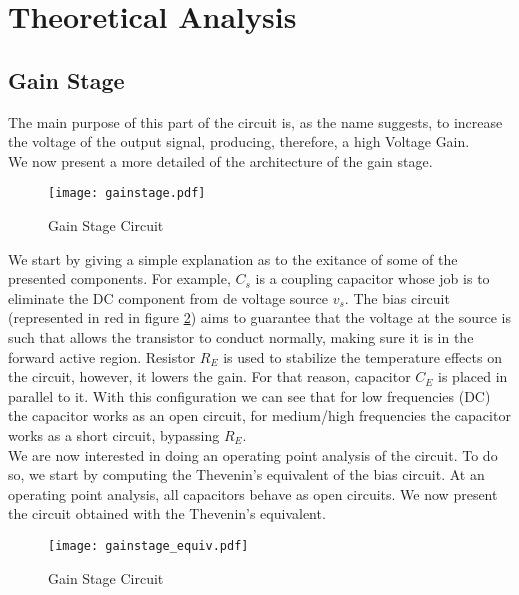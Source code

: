 \section{Theoretical Analysis}
\label{sec:theoretical}



\subsection{Gain Stage}
\par The main purpose of this part of the circuit is, as the name suggests, to increase the voltage of the output signal, producing, therefore, a high Voltage Gain.\\
We now present a more detailed of the architecture of the gain stage.

\begin{figure}[h!]
\centering
\texttt{[image: gainstage.pdf]}
\caption{Gain Stage Circuit}
\label{fig:gain_stage_circuit}
\end{figure}



We start by giving a simple explanation as to the exitance of some of the presented components. For example, $C_s$ is a coupling capacitor whose job is to eliminate the DC component from de voltage source $v_s$. The bias circuit (represented in red in figure \ref{fig:gain_stage_circuit}) aims to guarantee that the voltage at the source is such that allows the transistor to conduct normally, making sure it is in the forward active region.
Resistor $R_E$ is used to stabilize the temperature effects on the circuit, however, it lowers the gain. For that reason, capacitor $C_E$ is placed in parallel to it. With this configuration we can see that for low frequencies (DC) the capacitor works as an open circuit, for medium/high frequencies the capacitor works as a short circuit, bypassing $R_E$.\\

We are now interested in doing an operating point analysis of the circuit. To do so, we start by computing the Thevenin's equivalent of the bias circuit. At an operating point analysis, all capacitors behave as open circuits. We now present the circuit obtained with the Thevenin's equivalent.


\begin{figure}[h!]
\centering
\texttt{[image: gainstage\_equiv.pdf]}
\caption{Gain Stage Circuit}
\label{fig:gain_stage_circuit}
\end{figure}


